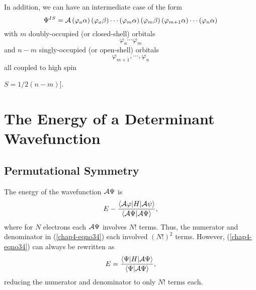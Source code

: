 In addition, we can have an intermediate case of the form
\begin{equation}
\Psi^{IS} = {\cal A} \left( \varphi_a \alpha \right) \left( \varphi_a \beta 
\right) \cdots \left( \varphi_m \alpha \right) \left( \varphi_m \beta \right) 
\left( \varphi_{m+1} \alpha \right) \cdots \left( \varphi_n \alpha 
\right) 
\label{chap4-eqno33-a}
\end{equation}
with $m$ doubly-occupied (or closed-shell) orbitals 
\begin{equation}
\varphi_a \cdots \varphi_m
\end{equation} 
and $n - m$ singly-occupied (or open-shell) orbitals
\begin{equation}
\varphi_{m+1} , \cdots , \varphi_n
\end{equation}
all coupled to high spin {$S = 1/2 (n-m)$].

\section{The Energy of a Determinant Wavefunction}

\subsection{Permutational Symmetry}

The energy of the wavefunction ${\cal A}\Psi$ is
\begin{equation}
E - {\langle {\cal A} \varphi | H | {\cal A} \psi \rangle \over 
\langle {\cal A} \Psi | {\cal A} \Psi \rangle} ,
\label{chap4-eqno34}
\end{equation}
where for $N$ electrons each ${\cal A}\Psi$ involves $N!$ terms.
Thus, the numerator and denominator in (\ref{chap4-eqno34}) each
involved $(N!)^2$ terms.  However, (\ref{chap4-eqno34}) can always be
rewritten as
\begin{equation}
E = { \langle \Psi | H | {\cal A} \Psi \rangle \over \langle 
\Psi | {\cal A} \Psi \rangle} ,
\label{chap4-eqno35}
\end{equation}
reducing the numerator and denominator to only $N!$ terms each.

}
